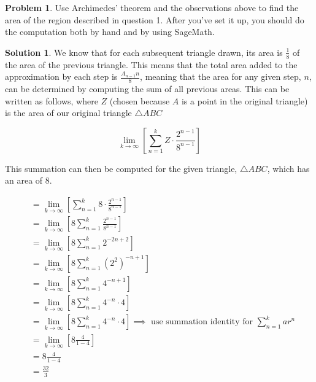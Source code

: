 \documentclass[10pt]{article}
\theoremstyle{definition}
\newtheorem{problem}{Problem}
\newtheorem{soln}{Solution}
\begin{document}
\begin{problem}
Use Archimedes' theorem and the observations above to find the area of the region described
in question 1. After you've set it up, you should do the computation both by hand and by
using SageMath.
\end{problem}
\begin{soln}
    We know that for each subsequent triangle drawn, its area is $\frac{1}{8}$ of the area of the previous triangle.
    This means that the total area added to the approximation by each step is $\frac{A_{n-1}n}{8}$, meaning that the area for any given step, $n$, can be determined by computing
    the sum of all previous areas. This can be written as follows, where $Z$ (chosen because $A$ is a point in the original triangle) is the area of our original triangle $\triangle ABC$

    \begin{equation}
        \lim_{k \to \infty}\left[\sum_{n = 1}^{k} Z \cdot \frac{2^{n-1}}{8^{n-1}}\right]
    \end{equation}

    This summation can then be computed for the given triangle, $\triangle ABC$, which has an area of $8$.

    \begin{align*}
         & = \lim_{k \to \infty}\left[\sum_{n = 1}^{k} 8 \cdot \frac{2^{n-1}}{8^{n-1}}\right]                                                  \\
         & = \lim_{k \to \infty}\left[8\sum_{n = 1}^{k} \frac{2^{n-1}}{8^{n-1}}\right]                                                         \\
         & = \lim_{k \to \infty}\left[8\sum_{n = 1}^{k} 2^{-2n+2}\right]                                                                       \\
         & = \lim_{k \to \infty}\left[8\sum_{n = 1}^{k} (2^2)^{-n+1}\right]                                                                    \\
         & = \lim_{k \to \infty}\left[8\sum_{n = 1}^{k} 4^{-n+1}\right]                                                                        \\
         & = \lim_{k \to \infty}\left[8\sum_{n = 1}^{k} 4^{-n}\cdot 4\right]                                                                   \\
         & = \lim_{k \to \infty}\left[8\sum_{n = 1}^{k} 4^{-n}\cdot 4\right] \implies \text{ use summation identity for } \sum_{n = 1}^{k}ar^n \\
         & = \lim_{k \to \infty}\left[8 \frac{4}{1-4} \right]                                                                                  \\
         & = 8 \frac{4}{1-4}                                                                                                                   \\
         & = \frac{32}{3}                                                                                                                      \\
    \end{align*}


\end{soln}
\end{document}
